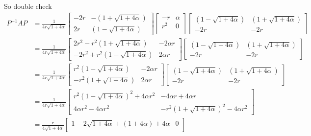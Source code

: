 \documentclass{article}
\begin{document}
So double check
\begin{align*}
P^{-1}AP &=
\frac{1}{ 4r\sqrt{1 + 4\alpha} }
\begin{bmatrix}
-2r	&	-\left( 1 + \sqrt{1 + 4\alpha} \right)	\\
2r	&	\left( 1 - \sqrt{1 + 4\alpha} \right)	
\end{bmatrix}
\begin{bmatrix}
-r		&	\alpha	\\
r^{2}	&	0	\\
\end{bmatrix}
\begin{bmatrix}
\left( 1 - \sqrt{1 + 4\alpha} \right)	&	\left( 1 + \sqrt{1 + 4\alpha} \right)	\\
-2r										&	-2r	
\end{bmatrix}
\\
&=
\frac{1}{ 4r\sqrt{1 + 4\alpha} }
\begin{bmatrix}
2r^{2}-r^{2}\left( 1 + \sqrt{1 + 4\alpha} \right) & -2\alpha r	\\
-2r^{2}+r^{2}\left( 1 - \sqrt{1 + 4\alpha} \right)	& 2\alpha r
\end{bmatrix}
\begin{bmatrix}
\left( 1 - \sqrt{1 + 4\alpha} \right)	&	\left( 1 + \sqrt{1 + 4\alpha} \right)	\\
-2r										&	-2r	
\end{bmatrix}
\\
&=
\frac{1}{ 4r\sqrt{1 + 4\alpha} }
\begin{bmatrix}
r^{2}\left( 1 - \sqrt{1 + 4\alpha} \right) & -2\alpha r	\\
-r^{2}\left( 1 + \sqrt{1 + 4\alpha} \right)	& 2\alpha r
\end{bmatrix}
\begin{bmatrix}
\left( 1 - \sqrt{1 + 4\alpha} \right)	&	\left( 1 + \sqrt{1 + 4\alpha} \right)	\\
-2r										&	-2r	
\end{bmatrix}
\\
&=
\frac{1}{ 4r\sqrt{1 + 4\alpha} }
\begin{bmatrix}
r^{2}\left( 1 - \sqrt{1 + 4\alpha} \right)^{2} +4\alpha r^{2}	&	-4\alpha r +4\alpha r	\\
4\alpha r^{2}-4\alpha r^{2}	& -r^{2}\left( 1 + \sqrt{1 + 4\alpha} \right)^{2} -4\alpha r^{2}
\end{bmatrix}
\\
&=
\frac{r}{ 4\sqrt{1 + 4\alpha} }
\begin{bmatrix}
1 - 2\sqrt{1 + 4\alpha} +(1+4\alpha) +4\alpha	&	0	\\

\end{bmatrix}
\end{align*}
\end{document}
